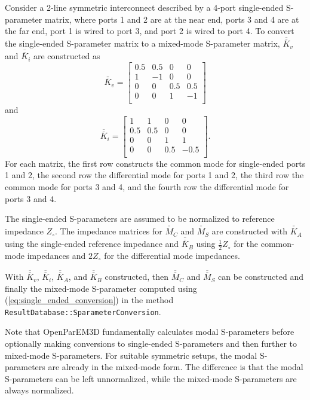 \documentclass[titlepage]{article}
\renewcommand\_{\textunderscore\linebreak[1]}
\begin{document}
Consider a 2-line symmetric interconnect described by a 4-port single-ended S-parameter matrix, where ports 1 and 2 are at the near end, ports 3 and 4 are at the far end, port 1 is wired to port 3, and port 2 is wired to port 4.  To convert the single-ended S-parameter matrix to a mixed-mode S-parameter matrix, $\overline{\overline{K}}_v$ and $\overline{\overline{K}}_i$ are constructed as
\begin{equation}
\overline{\overline{K}}_v=\left[
\begin{array}{cccc}
0.5 & 0.5 & 0 & 0 \\
1 & -1 & 0 & 0 \\
0 & 0 & 0.5 & 0.5 \\
0 & 0 & 1 & -1 \\
\end{array}
    \right]
\end{equation}
and
\begin{equation}
\overline{\overline{K}}_i=\left[
\begin{array}{cccc}
1 & 1 & 0 & 0 \\
0.5 & 0.5 & 0 & 0 \\
0 & 0 & 1 & 1 \\
0 & 0 & 0.5 & -0.5 \\
\end{array}
    \right].
\end{equation}
For each matrix, the first row constructs the common mode for single-ended ports 1 and 2, the second row the differential mode for ports 1 and 2, the third row the common mode for ports 3 and 4, and the fourth row the differential mode for ports 3 and 4.

The single-ended S-parameters are assumed to be normalized to reference impedance $Z_\circ$.  The impedance matrices for $\overline{\overline{M}}_C$ and $\overline{\overline{M}}_S$ are constructed with $\overline{\overline{K}}_A$ using the single-ended reference impedance and $\overline{\overline{K}}_B$ using $\frac{1}{2}Z_\circ$ for the common-mode impedances and $2Z_\circ$ for the differential mode impedances.

With $\overline{\overline{K}}_v$, $\overline{\overline{K}}_i$, $\overline{\overline{K}}_A$, and $\overline{\overline{K}}_B$ constructed, then $\overline{\overline{M}}_C$ and $\overline{\overline{M}}_S$ can be constructed and finally the mixed-mode S-parameter computed using (\ref{eq:single_ended_conversion}) in the method \texttt{ResultDatabase::SparameterConversion}.

Note that OpenParEM3D fundamentally calculates modal S-parameters before optionally making conversions to single-ended S-parameters and then further to mixed-mode S-parameters.  For suitable symmetric setups, the modal S-parameters are already in the mixed-mode form.  The difference is that the modal S-parameters can be left unnormalized, while the mixed-mode S-parameters are always normalized.
\end{document}
